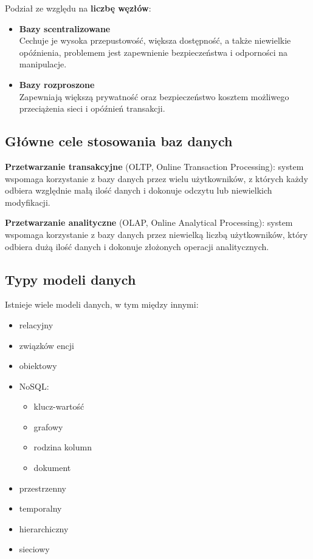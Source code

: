 Podział ze względu na \textbf{liczbę węzłów}:
\begin{itemize}
    \item \textbf{Bazy scentralizowane} \\
    Cechuje je wysoka przepustowość, większa dostępność, a także niewielkie opóźnienia, problemem jest zapewnienie bezpieczeństwa i odporności na manipulacje.
    \item \textbf{Bazy rozproszone} \\
    Zapewniają większą prywatność oraz bezpieczeństwo kosztem możliwego przeciążenia sieci i opóźnień transakcji.
\end{itemize}

\subsection{Główne cele stosowania baz danych}

\begin{definition}
    \textbf{Przetwarzanie transakcyjne} (OLTP, Online Transaction Processing): system wspomaga korzystanie z bazy danych przez wielu użytkowników, z których każdy odbiera względnie małą ilość danych i dokonuje odczytu lub niewielkich modyfikacji.
\end{definition}

\begin{definition}
    \textbf{Przetwarzanie analityczne} (OLAP, Online Analytical Processing): system wspomaga korzystanie z bazy danych przez niewielką liczbą użytkowników, który odbiera dużą ilość danych i dokonuje złożonych operacji analitycznych.
\end{definition}

\subsection{Typy modeli danych}

Istnieje wiele modeli danych, w tym między innymi:
\begin{itemize}
    \item relacyjny
    \item związków encji
    \item obiektowy
    \item NoSQL:
        \begin{itemize}
            \item klucz-wartość
            \item grafowy
            \item rodzina kolumn
            \item dokument
        \end{itemize}
    \item przestrzenny
    \item temporalny
    \item hierarchiczny
    \item sieciowy
\end{itemize}

